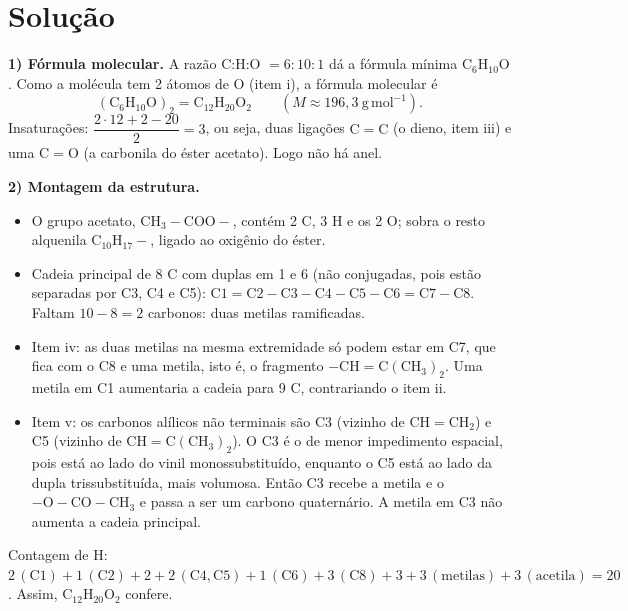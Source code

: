 \documentclass{article}%
\begin{document}
\section*{Solução}

\textbf{1) Fórmula molecular.} A razão C:H:O $=6:10:1$ dá a fórmula mínima $\mathrm{C_6H_{10}O}$. Como a molécula tem 2 átomos de O (item i), a fórmula molecular é
\[
(\mathrm{C_6H_{10}O})_2=\mathrm{C_{12}H_{20}O_2}\qquad (M\approx 196{,}3\ \mathrm{g\,mol^{-1}}).
\]
Insaturações: $\dfrac{2\cdot 12+2-20}{2}=3$, ou seja, duas ligações $\mathrm{C{=}C}$ (o dieno, item iii) e uma $\mathrm{C{=}O}$ (a carbonila do éster acetato). Logo não há anel.

\textbf{2) Montagem da estrutura.}
\begin{itemize}
\item O grupo acetato, $\mathrm{CH_3{-}COO{-}}$, contém 2 C, 3 H e os 2 O; sobra o resto alquenila $\mathrm{C_{10}H_{17}{-}}$, ligado ao oxigênio do éster.
\item Cadeia principal de 8 C com duplas em 1 e 6 (não conjugadas, pois estão separadas por C3, C4 e C5): $\mathrm{C1{=}C2{-}C3{-}C4{-}C5{-}C6{=}C7{-}C8}$. Faltam $10-8=2$ carbonos: duas metilas ramificadas.
\item Item iv: as duas metilas na mesma extremidade só podem estar em C7, que fica com o C8 e uma metila, isto é, o fragmento $\mathrm{{-}CH{=}C(CH_3)_2}$. Uma metila em C1 aumentaria a cadeia para 9 C, contrariando o item ii.
\item Item v: os carbonos alílicos não terminais são C3 (vizinho de $\mathrm{CH{=}CH_2}$) e C5 (vizinho de $\mathrm{CH{=}C(CH_3)_2}$). O C3 é o de menor impedimento espacial, pois está ao lado do vinil monossubstituído, enquanto o C5 está ao lado da dupla trissubstituída, mais volumosa. Então C3 recebe a metila e o $\mathrm{{-}O{-}CO{-}CH_3}$ e passa a ser um carbono quaternário. A metila em C3 não aumenta a cadeia principal.
\end{itemize}
Contagem de H: $2\,(\mathrm{C1})+1\,(\mathrm{C2})+2+2\,(\mathrm{C4,C5})+1\,(\mathrm{C6})+3\,(\mathrm{C8})+3+3\,(\text{metilas})+3\,(\text{acetila})=20$. Assim, $\mathrm{C_{12}H_{20}O_2}$ confere.
\end{document}
